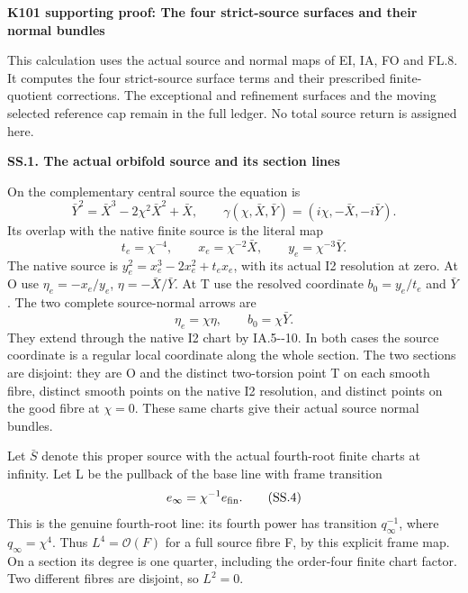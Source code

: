 \par\bigskip\noindent\textbf{K101 supporting proof: The four strict-source surfaces and their normal bundles}\par\nobreak
This calculation uses the actual source and normal maps of EI, IA,
FO and FL.8. It computes the four strict-source surface terms and
their prescribed finite-quotient corrections. The exceptional and
refinement surfaces and the moving selected reference cap remain
in the full ledger. No total source return is assigned here.

\par

\medskip\noindent\textbf{SS.1. The actual orbifold source and its section lines}

\par\nobreak

On the complementary central source the equation is
\[
 \bar Y^2=\bar X^3-2\chi^2\bar X^2+\bar X,
 \qquad
 \gamma(\chi,\bar X,\bar Y)=(i\chi,-\bar X,-i\bar Y).
 \tag{SS.1}
\]
Its overlap with the native finite source is the literal map
\[
 t_e=\chi^{-4},\qquad x_e=\chi^{-2}\bar X,
 \qquad y_e=\chi^{-3}\bar Y.
 \tag{SS.2}
\]
The native source is \(y_e^2=x_e^3-2x_e^2+t_ex_e\),
with its actual I2 resolution at zero. At O use
\(\eta_e=-x_e/y_e\), \(\eta=-\bar X/\bar Y\).
At T use the resolved coordinate \(b_0=y_e/t_e\)
and \(\bar Y\). The two complete source-normal arrows are
\[
 \eta_e=\chi\eta,
 \qquad b_0=\chi\bar Y.
 \tag{SS.3}
\]
They extend through the native I2 chart by IA.5-\/-10.
In both cases the source coordinate is a regular local
coordinate along the whole section. The two sections are
disjoint: they are O and the distinct two-torsion point T
on each smooth fibre, distinct smooth points on the native
I2 resolution, and distinct points on the good fibre at
\(\chi=0\). These same charts give their actual source
normal bundles.

Let \(\bar S\) denote this proper source with the actual
fourth-root finite charts at infinity. Let L be the pullback
of the base line with frame transition
\[
 e_\infty=\chi^{-1}e_{\rm fin}.
 \tag{SS.4}
\]
This is the genuine fourth-root line: its fourth power has
transition \(q_\infty^{-1}\), where
\(q_\infty=\chi^4\). Thus \(L^4=\mathcal O(F)\)
for a full source fibre F, by this explicit frame map.
On a section its degree is one quarter, including the
order-four finite chart factor. Two different fibres are
disjoint, so \(L^2=0\).

